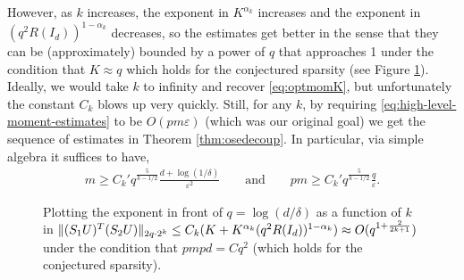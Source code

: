 \documentclass[11pt]{amsart}
\numberwithin{equation}{section}
\numberwithin{equation}{section}
\DeclarePairedDelimiter{\norm}{\lVert}{\rVert}
\begin{document}
However, as $k$ increases, the exponent in $K^{\alpha_k}$ increases and the exponent in $(q^2R(I_d))^{1-\alpha_k}$ decreases, so the estimates get better in the sense that they can be (approximately) bounded by a power of $q$ that approaches 1 under the condition that $K \approx q$ which holds for the conjectured sparsity (see Figure \ref{fig:q-exponent-vs-k}). Ideally, we would take $k$ to infinity and recover \eqref{eq:optmomK}, but unfortunately the constant $C_k$ blows up very quickly. Still, for any $k$, by requiring \eqref{eq:high-level-moment-estimates} to be $O(pm\varepsilon)$ (which was our original goal) we get the sequence of estimates in Theorem \ref{thm:osedecoup}. In particular, via simple algebra it suffices to have,
\begin{align*}
   m \ge C_k'q^{\frac{5}{k-1/2}} \frac{d+\log(1/\delta)}{\varepsilon^2}
\qquad\text{and}\qquad   pm \ge C_k'q^{\frac{5}{k-1/2}} \frac{q}{\varepsilon}.
\end{align*}



\begin{figure}[htbp]
  \centering


  \caption{Plotting the exponent in front of $q=\log(d/\delta)$ as a function of \(k\) in $
      \norm{(S_1 U)^T(S_2 U)}_{2q \cdot 2^k} \le C_k(K+K^{\alpha_k}(q^{2}R(I_d))^{1-\alpha_k}) \approx O(q^{1+\frac{2}{2k+1}})
  $ under the condition that $pmpd=Cq^2$ (which holds for the conjectured sparsity).}
  \label{fig:q-exponent-vs-k}
\end{figure}
\end{document}
